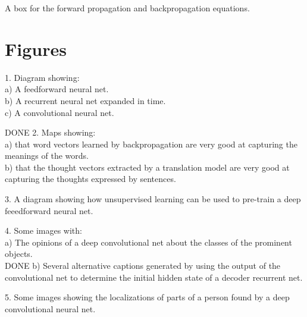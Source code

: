 \documentclass[]{article}
\begin{document}
A box for the forward propagation and backpropagation equations.

\section{Figures}

1. Diagram showing:\\ a) A feedforward neural net.\\ b) A recurrent neural
net expanded in time.\\ c) A convolutional neural net.

DONE 2. Maps showing:\\ a) that word vectors learned by backpropagation are very
good at capturing the meanings of the words.\\ b) that the thought vectors
extracted by a translation model are very good at capturing the thoughts
expressed by sentences.

3. A diagram showing how unsupervised learning can be used to pre-train a
deep feeedforward neural net.

4. Some images with:\\ a) The opinions of a deep convolutional net about
the classes of the prominent objects.\\ 
DONE b) Several alternative captions
generated by using the output of the convolutional net to determine the
initial hidden state of a decoder recurrent net.
 
5. Some images showing the localizations of parts of a person found by a
deep convolutional neural net.\\




\end{document}
